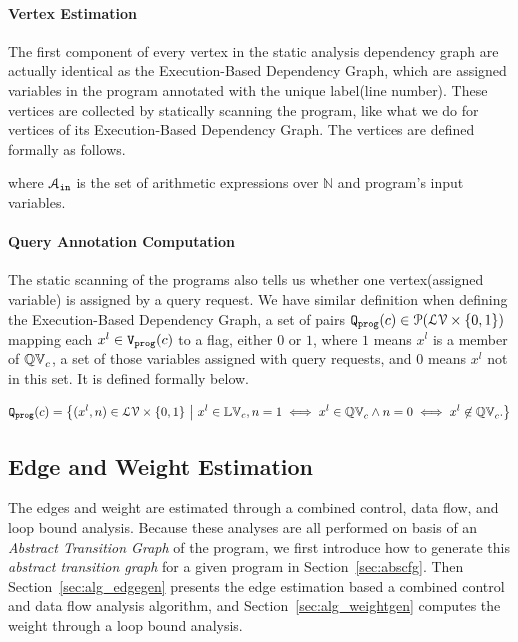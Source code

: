 \paragraph{Vertex Estimation}
The first component of every vertex in the static analysis dependency graph are actually identical as the  Execution-Based Dependency Graph, which are assigned variables in the program annotated with the unique label(line number). 
These vertices are collected by statically scanning the program, like what we do for vertices of its Execution-Based Dependency Graph. 
The vertices are defined formally as follows.

where $\mathcal{A}_{\mathtt{in}}$ is the set of arithmetic expressions over $\mathbb{N}$ and program's input variables. 

\paragraph{Query Annotation Computation}
The static scanning of the programs also tells us whether one vertex(assigned variable) is assigned by a query request. We have similar definition when defining the Execution-Based Dependency Graph, 
a set of pairs $\mathtt{{Q_{prog}}}(c) \in \mathcal{P}(\mathcal{LV} \times \{0, 1\} )$ 
mapping each $x^l \in \mathtt{{V_{prog}}}(c)$ to a flag, either $0$ or $1$, where $1$  means $x^{l}$ is a member of $ \mathbb{QV}_{c}$, a set of those variables assigned with query requests, and $0$ means $x^{l}$ not in this set. It is defined formally below.

\[\progF(c) =\left\{(x^l, n)  \in  \mathcal{LV} \times \{0, 1\} 
~ \middle\vert ~
x^l \in \lvar_{c},
n = 1 \iff x^l \in \qvar_{c} \land n = 0 \iff  x^l \not\in \qvar_{c} .
\right\}\]

\subsection{Edge and Weight Estimation}
\label{sec:alg_weightedgegen}
The edges and weight are estimated through a combined control, data flow, and loop bound analysis.
Because these analyses are all performed on basis of an \emph{Abstract Transition Graph} of the program, we first introduce how to generate this \emph{abstract transition graph} for a given program in Section~\ref{sec:abscfg}.
Then Section~\ref{sec:alg_edgegen} presents the edge estimation based a combined control and data flow analysis algorithm, and Section~\ref{sec:alg_weightgen}
computes the weight through a loop bound analysis.

